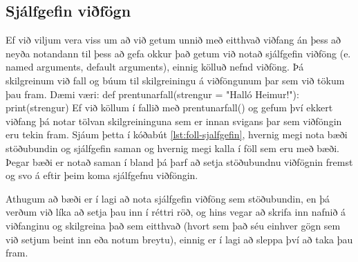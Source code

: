 \subsection{Sjálfgefin viðfögn}
Ef við viljum vera viss um að við getum unnið með eitthvað viðfang án þess að neyða notandann til þess að gefa okkur það getum við notað sjálfgefin viðföng (e. named arguments, default arguments), einnig kölluð nefnd viðföng.
Þá skilgreinum við fall og búum til skilgreiningu á viðföngunum þar sem við tökum þau fram.
Dæmi væri:
\newline def prentunarfall(strengur = "Halló Heimur!"): 
\newline \phantom{----}print(strengur)
\newline
Ef við köllum í fallið með prentunarfall() og gefum því ekkert viðfang þá notar tölvan skilgreininguna sem er innan svigans þar sem viðföngin eru tekin fram.
Sjáum þetta í kóðabút \ref{lst:foll-sjalfgefin}, hvernig megi nota bæði stöðubundin og sjálfgefin saman og hvernig megi kalla í föll sem eru með bæði.
Þegar bæði er notað saman í bland þá þarf að setja stöðubundnu viðfögnin fremst og svo á eftir þeim koma sjálfgefnu viðföngin.

Athugum að bæði er í lagi að nota sjálfgefin viðföng sem stöðubundin, en þá verðum við líka að setja þau inn í réttri röð, og hins vegar að skrifa inn nafnið á viðfanginu og skilgreina það sem eitthvað (hvort sem það séu einhver gögn sem við setjum beint inn eða notum breytu), einnig er í lagi að sleppa því að taka þau fram.

